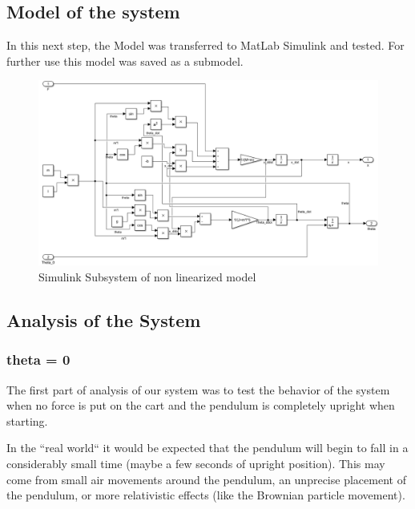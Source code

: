 \subsection{Model of the system}
In this next step, the Model was transferred to MatLab Simulink and tested. For further use this model was saved as a submodel.
\begin{figure}[H]
    \centering
    \includegraphics[width=1\textwidth]{Lab_report/pics/modelBuilding/non_linearized_model.PNG}
    \caption{Simulink Subsystem of non linearized model}
    \label{fig:non_linearized_model}
\end{figure}
\subsection{Analysis of the System}
\label{ssec:Analysis_of_non_lin_system}
\subsubsection{theta = 0}
The first part of analysis of our system was to test the behavior of the system when no force is put on the cart and the pendulum is completely upright when starting.

In the ``real world`` it would be expected that the pendulum will begin to fall in a considerably small time (maybe a few seconds of upright position). This may come from small air movements around the pendulum, an unprecise placement of the pendulum, or more relativistic effects (like the Brownian particle movement). 

